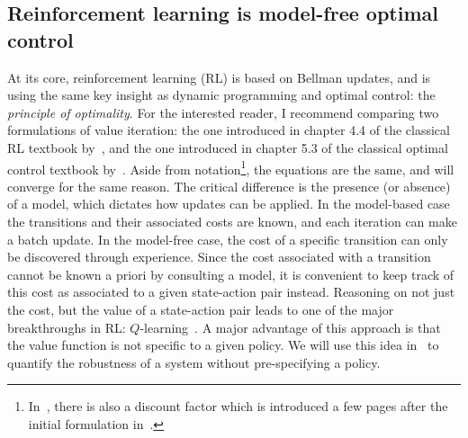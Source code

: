 \subsection{Reinforcement learning is model-free optimal control}
At its core, reinforcement learning (RL) is based on Bellman updates, and is using the same key insight as dynamic programming and optimal control: the \emph{principle of optimality}.
For the interested reader, I recommend comparing two formulations of value iteration: the one introduced in chapter 4.4 of the classical RL textbook by~\textcite{sutton2018book}, and the one introduced in chapter 5.3 of the classical optimal control textbook by~\textcite{bertsekas2017book}. Aside from notation\footnote{In~\cite{sutton2018book}, there is also a discount factor which is introduced a few pages after the initial formulation in~\cite{bertsekas2017book}.}, the equations are the same, and will converge for the same reason. The critical difference is the presence (or absence) of a model, which dictates how updates can be applied.
In the model-based case the transitions and their associated costs are known, and each iteration can make a batch update. In the model-free case, the cost of a specific transition can only be discovered through experience.
Since the cost associated with a transition cannot be known a priori by consulting a model, it is convenient to keep track of this cost as associated to a given state-action pair instead. Reasoning on not just the cost, but the value of a state-action pair leads to one of the major breakthroughs in RL: $Q$-learning~\cite[cf. chapter 6.5]{sutton2018book}. A major advantage of this approach is that the value function is not specific to a given policy. We will use this idea in~\cite{heim2019beyond} to quantify the robustness of a system without pre-specifying a policy.

